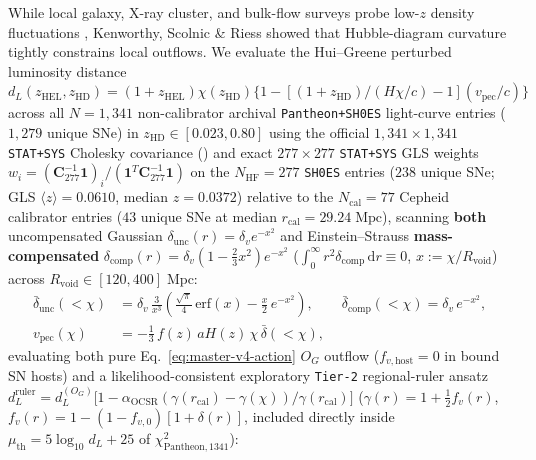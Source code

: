 \documentclass[11pt,a4paper]{article}
\begin{document}
While local galaxy, X-ray cluster, and bulk-flow surveys probe low-$z$ density fluctuations \cite{Keenan2013KBC,Boehringer2020CLASSIX,Tully2023CF4}, Kenworthy, Scolnic \& Riess \cite{Kenworthy2019LocalVoid} showed that Hubble-diagram curvature tightly constrains local outflows. We evaluate the Hui--Greene perturbed luminosity distance $d_L(z_{\mathrm{HEL}}, z_{\mathrm{HD}}) = (1 + z_{\mathrm{HEL}})\chi(z_{\mathrm{HD}})\bigl\{1 - [(1+z_{\mathrm{HD}})/(H\chi/c) - 1](v_{\mathrm{pec}}/c)\bigr\}$ across all $N = 1{,}341$ non-calibrator archival \texttt{Pantheon+SH0ES} light-curve entries ($1{,}279$ unique SNe) in $z_{\mathrm{HD}} \in [0.023, 0.80]$ \cite{Brout2022PantheonPlus} using the official $1{,}341\times 1{,}341$ \texttt{STAT+SYS} Cholesky covariance () and exact $277\times 277$ \texttt{STAT+SYS} GLS weights $w_i = (\mathbf{C}_{277}^{-1}\mathbf{1})_i/(\mathbf{1}^T\mathbf{C}_{277}^{-1}\mathbf{1})$ on the $N_{\mathrm{HF}} = 277$ \texttt{SH0ES} entries ($238$ unique SNe; GLS $\langle z\rangle = 0.0610$, median $z = 0.0372$) relative to the $N_{\mathrm{cal}} = 77$ Cepheid calibrator entries ($43$ unique SNe at median $r_{\mathrm{cal}} = 29.24\;\mathrm{Mpc}$), scanning \textbf{both} uncompensated Gaussian $\delta_{\mathrm{unc}}(r) = \delta_v e^{-x^2}$ and Einstein--Strauss \textbf{mass-compensated} $\delta_{\mathrm{comp}}(r) = \delta_v(1 - \frac{2}{3}x^2)e^{-x^2}$ ($\int_0^\infty r^2\delta_{\mathrm{comp}}\,\mathrm{d}r \equiv 0$, $x := \chi/R_{\mathrm{void}}$) across $R_{\mathrm{void}} \in [120, 400]\;\mathrm{Mpc}$:
\begin{equation}
\begin{aligned}
  \bar{\delta}_{\mathrm{unc}}(<\chi) &= \delta_v\,\frac{3}{x^3}\left(\frac{\sqrt{\pi}}{4}\,\mathrm{erf}(x) - \frac{x}{2}\,e^{-x^2}\right), \qquad
  \bar{\delta}_{\mathrm{comp}}(<\chi) = \delta_v\,e^{-x^2}, \\
  v_{\mathrm{pec}}(\chi) &= -\frac{1}{3}\,f(z)\,a H(z)\,\chi\,\bar{\delta}(<\chi),
\end{aligned}
\label{eq:enclosed-gaussian}
\end{equation}
evaluating both pure Eq.~\eqref{eq:master-v4-action} $O_G$ outflow ($f_{v,\mathrm{host}} = 0$ in bound SN hosts) and a likelihood-consistent exploratory \texttt{Tier-2} regional-ruler ansatz $d_L^{\mathrm{ruler}} = d_L^{(O_G)}\bigl[1 - \alpha_{\mathrm{OCSR}}(\gamma(r_{\mathrm{cal}}) - \gamma(\chi))/\gamma(r_{\mathrm{cal}})\bigr]$ ($\gamma(r) = 1 + \frac{1}{2}f_v(r)$, $f_v(r) = 1 - (1 - f_{v,0})[1 + \delta(r)]$, included directly inside $\mu_{\mathrm{th}} = 5\log_{10}d_L + 25$ of $\chi^2_{\mathrm{Pantheon},1341}$):
\end{document}
